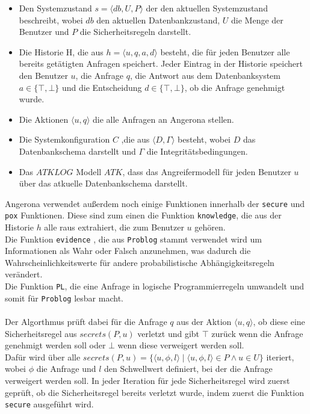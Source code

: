 \documentclass[german,version-2020-11]{uzl-thesis}
\begin{document}
\begin{itemize}
	\item Den Systemzustand $s=\langle db,U,P\rangle $ der den aktuellen Systemzustand beschreibt, wobei $db$ den aktuellen Datenbankzustand, $U$ die Menge der Benutzer und $P$ die Sicherheitsregeln darstellt.
	\item Die Historie H, die aus $h=\langle u,q,a,d \rangle$ besteht, die für jeden Benutzer alle bereits getätigten Anfragen speichert. Jeder Eintrag in der Historie speichert den Benutzer $u$, die Anfrage $q$, die Antwort aus dem Datenbanksystem $a \in \{\top, \bot \}$ und die Entscheidung $d \in \{\top, \bot \}$, ob die Anfrage genehmigt wurde.
	\item Die Aktionen $\langle u,q \rangle$ die alle Anfragen an Angerona stellen.
	\item Die Systemkonfiguration $C$ ,die aus $\langle D,\Gamma \rangle$ besteht, wobei $D$  das Datenbankschema darstellt und $\Gamma$ die Integritätsbedingungen. 
	\item  Das $ATKLOG$ Modell $ATK$, dass das Angreifermodell für jeden Benutzer $u$ über das atkuelle Datenbankschema darstellt.
\end{itemize}
Angerona verwendet außerdem noch einige Funktionen innerhalb der \texttt{secure} und \texttt{pox} Funktionen. Diese sind zum einen die Funktion \texttt{knowledge}, die aus der Historie $h$ alle raus extrahiert, die zum Benutzer $u$ gehören.\\
Die Funktion \texttt{evidence} , die aus \texttt{Problog} stammt verwendet wird um Informationen als Wahr oder Falsch anzunehmen, was dadurch die Wahrscheinlichkeitswerte für andere probabilistische Abhängigkeitsregeln verändert.\\ 
Die Funktion \texttt{PL}, die  eine Anfrage in logische Programmierregeln umwandelt und somit für \texttt{Problog} lesbar macht. \cite{guarnieri2017securing} \\ \\
Der Algorthmus prüft dabei für die Anfrage $q$ aus der Aktion $\langle u,q \rangle$, ob diese eine Sicherheitsregel aus $secrets(P,u)$ verletzt und gibt $\top$ zurück wenn die Anfrage genehmigt werden soll oder $\bot$ wenn diese verweigert werden soll. \\ 
Dafür wird über alle  $secrets(P,u) = \{ \langle u,\phi,l \rangle \mid \langle u,\phi,l \rangle \in P \land u \in U\}$ iteriert, wobei $\phi$ die Anfrage und $l$ den Schwellwert definiert, bei der die Anfrage verweigert werden soll. In jeder Iteration für jede Sicherheitsregel wird zuerst geprüft, ob die Sicherheitsregel bereits verletzt wurde, indem zuerst die Funktion \texttt{secure} ausgeführt wird. \\ 
\end{document}

